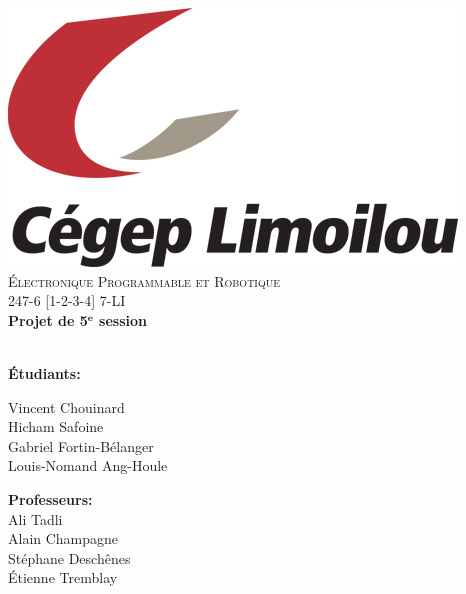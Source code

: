 \documentclass[10pt,a4paper,final]{article}
\begin{document}
\renewcommand\headrulewidth{0pt}
\fancyfoot[C]{ }






\begin{center}
\includegraphics[scale=1]{Figures/School_Logo.jpg}~\\[1cm]  
\textsc{\LARGE \'{E}lectronique Programmable et Robotique}\\[1.5cm]
\Large 247-6 [1-2-3-4] 7-LI\\[0.5cm]
{ \huge \bfseries Projet de 5$\mathbf{^{e}}$ session \\[0.4cm] }
\HRule \\[1.5cm]





\begin{multicols}{2}
\begin{flushleft}



\textbf{Étudiants:}\\

\bigskip

Vincent Chouinard\\
Hicham Safoine\\
Gabriel Fortin-Bélanger\\ 
Louis-Nomand Ang-Houle\\




\end{flushleft}
\vfill
\begin{flushright}

\textbf{Professeurs:}\\
\medskip
Ali Tadli\\
Alain Champagne\\
Stéphane Deschênes\\
Étienne Tremblay\\




\end{flushright}
\end{multicols}
\end{center}
\end{document}
